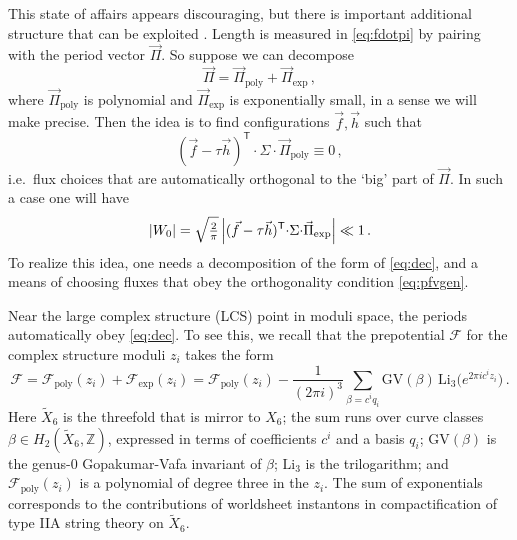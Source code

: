 \documentclass[12pt,a4wide]{article}
\begin{document}
This state of affairs appears discouraging,
but
there is important additional structure that can be exploited \cite{Demirtas:2019sip}.
Length is measured in \eqref{eq:fdotpi} by pairing with the period vector $\vec{\Pi}$.  So suppose we can decompose 
\begin{equation}\label{eq:dec}
    \vec{\Pi} = \vec{\Pi}_{\text{poly}} + \vec{\Pi}_{\text{exp}}\,,
\end{equation}
where $\vec{\Pi}_{\text{poly}}$ is polynomial  and 
$\vec{\Pi}_{\text{exp}}$ is exponentially small, in a sense we will make precise.
Then the idea is to find configurations $\vec{f},\vec{h}$ such that
\begin{equation}\label{eq:pfvgen}   
   (\vec{f}-\tau\vec{h})^{\mathsf{T}} {\cdot}  \Sigma {\cdot}\vec{\Pi}_{\text{poly}}\equiv 0\,,
\end{equation} 
i.e.~flux choices that are automatically orthogonal to the `big' part of $\vec{\Pi}$.
In such a case one will have
\begin{equation}
    |W_0| =  \sqrt{\tfrac{2}{\pi}}\,\Bigl|(\vec{f}-\tau\vec{h})^{\mathsf{T}} {\cdot}\Sigma {\cdot} \vec{\Pi}_{\text{exp}}\Bigr| \ll 1\,.
\end{equation}
To realize this idea, one needs a decomposition of the form of \eqref{eq:dec}, and a means of choosing fluxes that obey the orthogonality condition \eqref{eq:pfvgen}.  

Near the large complex structure (LCS) point in moduli space, the periods automatically obey  \eqref{eq:dec}.  To see this, we recall that the prepotential $\mathcal{F}$ for the complex structure moduli $z_i$ takes the form
\begin{equation}\label{eq:prep}
 \mathcal{F} =  
 \mathcal{F}_{\text{poly}}(z_i) + \mathcal{F}_{\text{exp}}(z_i) = \mathcal{F}_{\text{poly}}(z_i) -\frac{1}{(2\pi i)^3} \sum_{\beta = c^i q_i} \text{GV}(\beta)\,\text{Li}_3\bigl(e^{2\pi i c^i z_i}\bigr)\,.
\end{equation} 
Here $\widetilde{X}_6$ is the threefold that is mirror to $X_6$; the sum runs over curve classes $\beta \in H_2(\widetilde{X}_6,\mathbb{Z})$,
expressed in terms of coefficients $c^i$ and a basis $q_i$; $\text{GV}(\beta)$ is the genus-0 Gopakumar-Vafa invariant of $\beta$; $\text{Li}_3$ is the trilogarithm; and 
$\mathcal{F}_{\text{poly}}(z_i)$ is a polynomial of degree three in the $z_i$.
The sum of exponentials corresponds to the contributions of worldsheet instantons in compactification of type IIA string theory on $\widetilde{X}_6$.  
\end{document}
